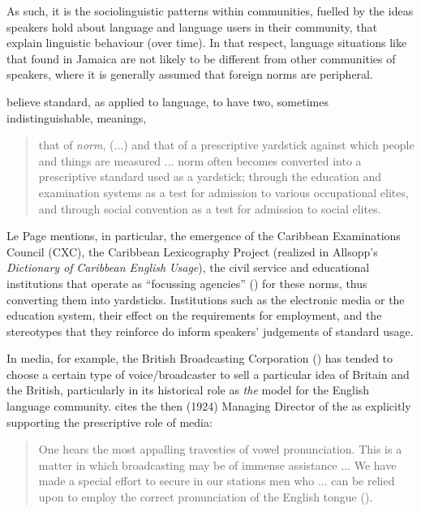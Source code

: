 As such, it is the sociolinguistic patterns within communities, fuelled by the ideas speakers hold about language and language users in their community, that explain linguistic behaviour (over time).  In that respect, language situations like that found in Jamaica are not likely to be different from other communities of speakers, where it is generally assumed that foreign norms are peripheral.  

\citet[191]{LePageTabouret1985} believe standard, as applied to language, to have two, sometimes indistinguishable, meanings,

\begin{quote}that of \textit{norm}, (...) and that of a prescriptive yardstick against which people and things are measured ... norm often becomes converted into a prescriptive standard used as a yardstick; through the education and examination systems as a test for admission to various occupational elites, and through social convention as a test for admission to social elites.\end{quote} 
Le Page mentions, in particular, the emergence of the Caribbean Examinations Council (CXC), the Caribbean Lexicography Project (realized in Allsopp’s \textit{Dictionary of} \textit{Caribbean English} \textit{Usage}), the civil service and educational institutions that operate as “focussing agencies” (\citealt[34--35]{LePage1988}) for these norms, thus converting them into yardsticks.  Institutions such as the electronic media or the education system, their effect on the requirements for employment, and the stereotypes that they reinforce do inform speakers’ judgements of standard usage.

In media, for example, the British Broadcasting Corporation () has tended to choose a certain type of voice\slash broadcaster to sell a particular idea of Britain and the British, particularly in its historical role as \textit{the} model for the English language community.  \citet{Lippi-Green1997} cites the then (1924) Managing Director of the  as explicitly supporting the prescriptive role of media:

\begin{quote}One hears the most appalling travesties of vowel pronunciation.  This is a matter in which broadcasting may be of immense assistance ... We have made a special effort to secure in our stations men who ... can be relied upon to employ the correct pronunciation of the English tongue (\citeyear[137]{Lippi-Green1997}).\end{quote}

